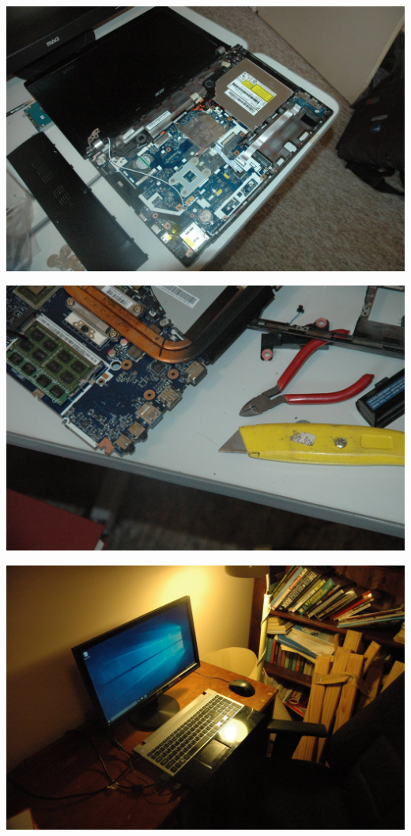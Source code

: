     		\centerline{\includegraphics[width=\linewidth]{images/laptop_repair_1}}
    		\vspace{10pt}
    		
    		\centerline{\includegraphics[width=\linewidth]{images/laptop_repair_2}}
    		\vspace{10pt}
    		
    		\centerline{\includegraphics[width=\linewidth]{images/laptop_repair_3}}
    		\vspace{10pt}
    		
